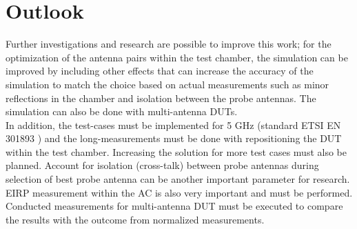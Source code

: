 \section{Outlook}
Further investigations and research are possible to improve this work; for the optimization of the antenna pairs within the test chamber, the simulation can be improved by including other effects that can increase the accuracy of the simulation to match the choice based on actual measurements such as minor reflections in the chamber and isolation between the probe antennas. The simulation can also be done with multi-antenna \acsp{DUT}. \\

 In addition, the test-cases must be implemented for 5 GHz (standard ETSI EN 301893 \cite{etsi301893}) and the long-measurements must be done with repositioning the \acs{DUT} within the test chamber. Increasing the solution for more test cases must also be planned.  Account for isolation (cross-talk) between probe antennas during selection of best probe antenna can be another important parameter for research. \\
 
 \acs{EIRP} measurement within the \acf{AC} is also very important and must be performed. Conducted measurements for multi-antenna \acs{DUT} must be executed to compare the results with the outcome from normalized measurements. 


